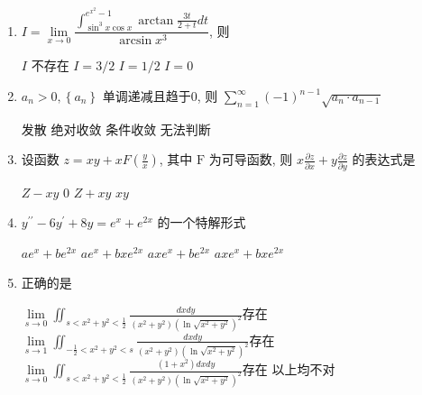\begin{enumerate}
\begin{enumerate}
\item 
$I=\lim\limits _{x \rightarrow 0} \dfrac{\int_{\sin ^{3} x \cos x}^{e^{x^{2}}-1} \arctan \frac{3 t}{2+t} d t}{\arcsin x^{3}}$, 则  

\fourchoices
{$I$ 不存在}
{$I=3 / 2$}
{$I=1 / 2$}
{$I=0$}

\item 
$a_{n}>0,\left\{a_{n}\right\}$ 单调递减且趋于$  0  $, 则 $\sum\limits_{n=1}^{\infty}(-1)^{n-1} \sqrt{a_{n} \cdot a_{n-1}}$  
 

\fourchoices
{发散}
{绝对收敛}
{条件收敛}
{无法判断}

\item 
设函数 $z=x y+x F\left(\frac{y}{x}\right)$, 其中 $\mathrm{F}$ 为可导函数, 则 $x \frac{\partial z}{\partial x}+y \frac{\partial z}{\partial y}$ 的表达式是  

\fourchoices
{$Z-x y$}
{$ 0 $}
{$Z+x y$}
{$x y$}

\item 
$y^{\prime \prime}-6 y^{\prime}+8 y=e^{x}+e^{2 x}$ 的一个特解形式  


\fourchoices
{$a e^{x}+b e^{2 x} $}
{$ a e^{x}+b x e^{2 x} $}
{$a x e^{x}+b e^{2x} $}
{$ a x e^{x}+b x e^{2 x}$}

\item 
正确的是  


\fourchoices
{$\lim\limits _{s \rightarrow 0} \iint_{s <x^{2}+y^{2}< \frac{ 1 }{ 2 } } \frac{d x d y}{\left(x^{2}+y^{2}\right)\left(\ln \sqrt{x^{2}+y^{2}}\right)^{2}}$存在}
{$\lim\limits _{s \rightarrow 1} \iint_{-\frac{1}{2}<x^{2}+y^{2}<s} \frac{d x d y}{\left(x^{2}+y^{2}\right)\left(\ln \sqrt{x^{2}+y^{2}}\right)^{2}} $存在}
{$\lim\limits _{s \rightarrow 0} \iint_{s <x^{2}+y^{2}< \frac{ 1 }{ 2 } } \frac{\left(1+x^{2}\right) d x d y}{\left(x^{2}+y^{2}\right)\left(\ln \sqrt{x^{2}+y^{2}}\right)^{2}}$存在}
{以上均不对}




\end{enumerate}


\end{enumerate}
